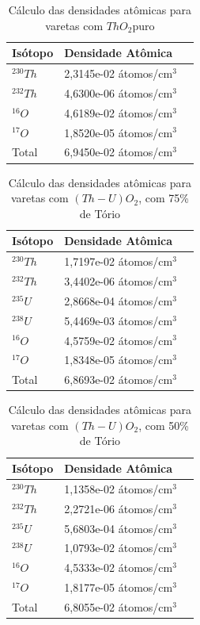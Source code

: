 \documentclass[
	12pt,				%
	openany,			%
	twoside,			%
	a4paper,			%
	english,			%
	french,				%
	spanish,			%
	brazil				%
	]{abntex2}
\begin{document}
\begin{center}
\begin{longtable}{|l|l|l|}
\caption[Cálculo das densidades atômicas para varetas com $ThO_{2}$puro]{Cálculo das densidades atômicas para varetas com $ThO_{2}$puro}

\label{DENS_TH} \\

\hline 
Isótopo & Densidade Atômica\tabularnewline
\hline 
\hline 
$^{230}Th$  & 2,3145e-02 átomos/cm$^3$\tabularnewline
\hline 
$^{232}Th$  & 4,6300e-06 átomos/cm$^3$\tabularnewline
\hline 
$^{16}O$  & 4,6189e-02 átomos/cm$^3$\tabularnewline
\hline 
$^{17}O$  & 1,8520e-05 átomos/cm$^3$\tabularnewline
\hline 
Total & 6,9450e-02 átomos/cm$^3$\tabularnewline
\hline 
\end{longtable}


\begin{longtable}{|l|l|l|}
\caption[Cálculo das densidades atômicas para varetas com $(Th-U)O_{2}$, com 75\% de Tório]{Cálculo das densidades atômicas para varetas com $(Th-U)O_{2}$, com 75\% de Tório}

\label{DENS_U25} \\

\hline 
Isótopo & Densidade Atômica\tabularnewline
\hline 
\hline 
$^{230}Th$  & 1,7197e-02 átomos/cm$^3$\tabularnewline
\hline 
$^{232}Th$  & 3,4402e-06 átomos/cm$^3$\tabularnewline
\hline 
$^{235}U$  & 2,8668e-04 átomos/cm$^3$\tabularnewline
\hline 
$^{238}U$  & 5,4469e-03 átomos/cm$^3$\tabularnewline
\hline 
$^{16}O$  & 4,5759e-02 átomos/cm$^3$\tabularnewline
\hline 
$^{17}O$  & 1,8348e-05 átomos/cm$^3$\tabularnewline
\hline 
Total & 6,8693e-02 átomos/cm$^3$\tabularnewline
\hline 
\end{longtable}

\begin{longtable}{|l|l|l|}
\caption[Cálculo das densidades atômicas para varetas com $(Th-U)O_{2}$, com 50\% de Tório]{Cálculo das densidades atômicas para varetas com $(Th-U)O_{2}$, com 50\% de Tório}

\label{DENS_U50} \\

\hline 
Isótopo & Densidade Atômica\tabularnewline
\hline 
\hline 
$^{230}Th$  & 1,1358e-02 átomos/cm$^3$\tabularnewline
\hline 
$^{232}Th$  & 2,2721e-06 átomos/cm$^3$\tabularnewline
\hline 
$^{235}U$  & 5,6803e-04 átomos/cm$^3$\tabularnewline
\hline 
$^{238}U$  & 1,0793e-02 átomos/cm$^3$\tabularnewline
\hline 
$^{16}O$  & 4,5333e-02 átomos/cm$^3$\tabularnewline
\hline 
$^{17}O$  & 1,8177e-05 átomos/cm$^3$\tabularnewline
\hline 
Total & 6,8055e-02 átomos/cm$^3$\tabularnewline
\hline 
\end{longtable}
\end{center}
\end{document}
